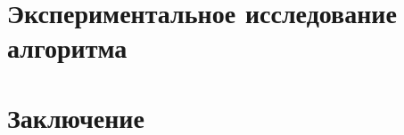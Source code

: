 \documentclass[12pt]{article}
\newcommand{\intro}[1]{
    \stepcounter{section}
    \section*{\hfillПРИЛОЖЕНИЕ \arabic{section}}
    \begin{center}
        \bf{#1}
    \end{center}
    \markboth{\MakeUppercase{#1}}{}
    \addcontentsline{toc}{section}{Приложение \arabic{section}. #1}
}
\begin{document}
\newpage
\section{Экспериментальное исследование алгоритма}


\newpage
\section{Заключение}


\newpage
\printbibliography

\appendix

% 
\end{document}
